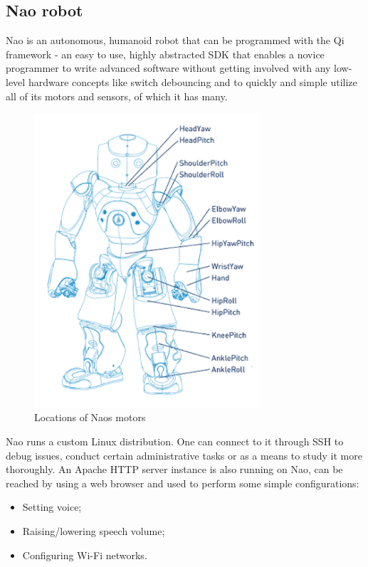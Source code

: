\documentclass[12pt, fleqn, a4paper]{article}
\begin{document}
\subsection{Nao robot}
Nao is an autonomous, humanoid robot that can be programmed with the Qi framework - an easy to use, highly abstracted SDK that enables a novice programmer to write advanced software without getting involved with any low-level hardware concepts like switch debouncing and to quickly and simple utilize all of its motors and sensors, of which it has many.
\begin{figure}[H]
	\centering
	\includegraphics[width=0.75\textwidth]{img/nao.png}
	\caption{Locations of Naos motors}
\end{figure}
Nao runs a custom Linux distribution. One can connect to it through SSH to debug issues, conduct certain administrative tasks or as a means to study it more thoroughly. An Apache HTTP server instance is also running on Nao, can be reached by using a web browser and used to perform some simple configurations:
\begin{itemize}
	\item Setting voice;
	\item Raising/lowering speech volume;
	\item Configuring Wi-Fi networks.
\end{itemize}
\par
\end{document}
